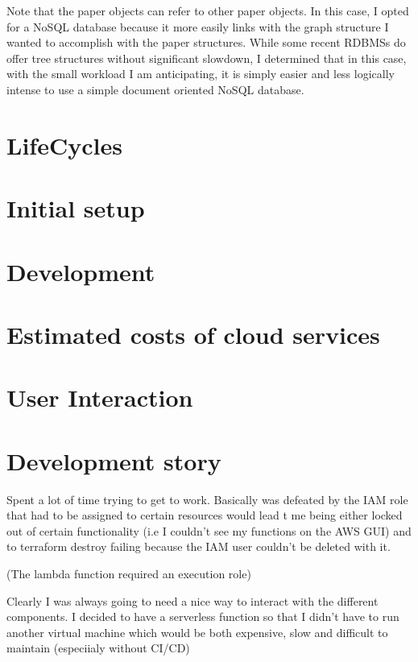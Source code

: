 \documentclass[12pt]{article}
\begin{document}
Note that the paper objects can refer to other paper objects. In this case, I opted for a NoSQL database because it more easily links with the graph structure I wanted to accomplish with the paper structures. While some recent RDBMSs do offer tree structures without significant slowdown, I determined that in this case, with the small workload I am anticipating, it is simply easier and less logically intense to use a simple document oriented NoSQL database.

\section*{LifeCycles}

\section{Initial setup}

\section{Development}

\section*{Estimated costs of cloud services}
\section*{User Interaction}

\section*{Development story}

Spent a lot of time trying to get to work.
Basically was defeated by the IAM role that had to be assigned to certain resources would lead t me being either locked out of certain functionality (i.e I couldn't see my functions on the AWS GUI) and to terraform destroy failing because the IAM user couldn't be deleted with it.

(The lambda function required an execution role)


Clearly I was always going to need a nice way to interact with the different components. I decided to have a serverless function so that I didn't have to run another virtual machine which would be both expensive, slow and difficult to maintain (especiialy without CI/CD)
\end{document}
